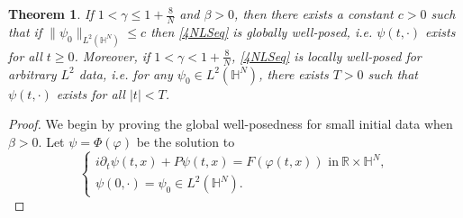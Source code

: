 \documentclass[10pt,leqno]{amsart}
\newtheorem{thm}{Theorem}[section]
\numberwithin{equation}{section}
\newcommand{\field}[1]{\mathbb{#1}}
\newcommand{\R}{\field{R}}          		%
\newcommand{\Hy}{\field{H}}
\begin{document}
\begin{thm}
\label{thmexl2}
 If $1<\gamma \leq 1+ \tfrac{8}{N}$ and $\beta>0$, then there exists a constant $c>0$ such that if $\|\psi_0\|_{L^2 (\mathbb{H}^N )}\leq c$ then \eqref{4NLSeq} is globally well-posed, i.e. $\psi(t,\cdot)$ exists for all $t\geq 0$. Moreover, if $1<\gamma < 1+\tfrac{8}{N}$, \eqref{4NLSeq} is locally well-posed for arbitrary $L^2$ data, i.e. for any $\psi_0\in L^2 (\mathbb{H}^N)$, there exists $T>0$ such that $\psi(t,\cdot)$ exists for all $|t|< T$.
\end{thm}

\begin{proof}
We begin by proving the global well-posedness for small initial data when $\beta>0$. Let $\psi=\Phi(\varphi)$ be the solution to 
\begin{equation*}
\begin{cases}i\partial_t \psi(t,x) +P \psi(t,x) =F(\varphi(t,x))\mbox{ in}\ \R\times \Hy^N ,\\ \psi(0,\cdot)=\psi_0 \in L^2 (\Hy^N).\end{cases}
\end{equation*}


\end{proof}
\end{document}
